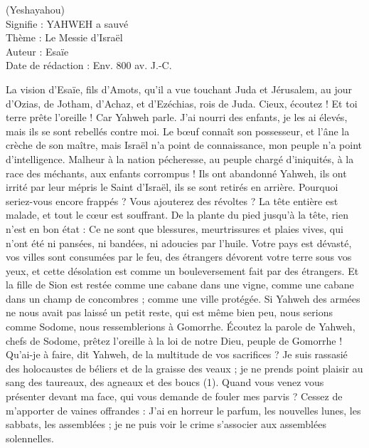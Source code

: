 \BFont
\begin{center}
(Yeshayahou)
\\Signifie : YAHWEH a sauvé
\\Thème : Le Messie d'Israël
\\Auteur : Esaïe
\\Date de rédaction : Env. 800 av. J.-C.
\end{center}
\begin{multicols}{2}
\VerseOne{}La vision d'Esaïe, fils d'Amots, qu’il a vue touchant Juda et Jérusalem, au jour d’Ozias, de Jotham, d'Achaz, et d'Ezéchias, rois de Juda.
Cieux, écoutez ! Et toi terre prête l'oreille ! Car Yahweh parle. J’ai nourri des enfants, je les ai élevés, mais ils se sont rebellés contre moi.
Le bœuf connaît son possesseur, et l'âne la crèche de son maître, mais Israël n'a point de connaissance, mon peuple n'a point d'intelligence.
Malheur à la nation pécheresse, au peuple chargé d'iniquités, à la race des méchants, aux enfants corrompus ! Ils ont abandonné Yahweh, ils ont irrité par leur mépris le Saint d'Israël, ils se sont retirés en arrière.
Pourquoi seriez-vous encore frappés ? Vous ajouterez des révoltes ? La tête entière est malade, et tout le cœur est souffrant.
De la plante du pied jusqu'à la tête, rien n’est en bon état : Ce ne sont que blessures, meurtrissures et plaies vives, qui n'ont été ni pansées, ni bandées, ni adoucies par l’huile.
Votre pays est dévasté, vos villes sont consumées par le feu, des étrangers dévorent votre terre sous vos yeux, et cette désolation est comme un bouleversement fait par des étrangers.
Et la fille de Sion est restée comme une cabane dans une vigne, comme une cabane dans un champ de concombres ; comme une ville protégée.
Si Yahweh des armées ne nous avait pas laissé un petit reste, qui est même bien peu, nous serions comme Sodome, nous ressemblerions à Gomorrhe.
Écoutez la parole de Yahweh, chefs de Sodome, prêtez l'oreille à la loi de notre Dieu, peuple de Gomorrhe !
Qu'ai-je à faire, dit Yahweh, de la multitude de vos sacrifices ? Je suis rassasié des holocaustes de béliers et de la graisse des veaux ; je ne prends point plaisir au sang des taureaux, des agneaux et des boucs (1).
Quand vous venez vous présenter devant ma face, qui vous demande de fouler mes parvis ?
Cessez de m'apporter de vaines offrandes : J’ai en horreur le parfum, les nouvelles lunes, les sabbats, les assemblées ; je ne puis voir le crime s’associer aux assemblées solennelles.

\end{multicols}
